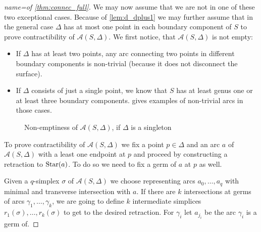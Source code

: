 \begin{proof}[{name={of \autoref{thm:connec_full}}}]
	We may now assume that we are not in one of these two exceptional cases.
	Because of \autoref{lem:d_dplus1} we may further assume that in the general case $\Delta$ has at most one point in each boundary component of $S$ to prove contractibility of $\mathcal{A}(S,\Delta)$. 
	We first notice, that $\mathcal{A}(S,\Delta)$ is not empty: 
	\begin{itemize}
		\item If $\Delta$ has at least two points, any arc connecting two points in different boundary components is non-trivial (because it does not disconnect the surface).
		\item If $\Delta$ consists of just a single point, we know that $S$ has at least genus one or at least three boundary components.
		 gives examples of non-trivial arcs in those cases.
	\end{itemize}
	\begin{figure}[htb]
		\centering
		\caption{Non-emptiness of $\mathcal{A}(S,\Delta)$, if $\Delta$ is a singleton}\label{fig:non-empty-delta-one}
	\end{figure}
	To prove contractibility of $\mathcal{A}(S,\Delta)$ we fix a point $p \in \Delta$ and an arc $a$ of $\mathcal{A}(S,\Delta)$ with a least one endpoint at $p$ and proceed by
	constructing a retraction to $\operatorname{Star}(a)$.
	To do so we need to fix a germ of $a$ at $p$ as well.
	
	Given a $q$-simplex $\sigma$ of $\mathcal{A}(S,\Delta)$ we choose representing arcs $a_0, \ldots ,a_q$ with minimal and transverse intersection with $a$.
	If there are $k$ intersections at germs of arcs $\gamma_1, \ldots ,\gamma_k$, we are going to define $k$ intermediate simplices $r_1(\sigma), \ldots ,r_k(\sigma)$ to get to the desired retraction.
	For $\gamma_i$ let $a_{j_i}$ be the arc $\gamma_i$ is a germ of.


\end{proof}
